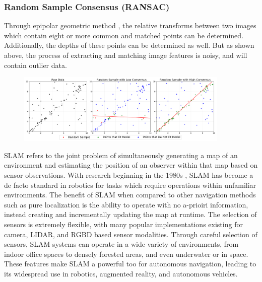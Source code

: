 \subsubsection{Random Sample Consensus (RANSAC)}

Through epipolar geometric method , the relative transforms between two images which contain eight or more common and matched points can be determined\cite{longuet-higginsComputerAlgorithmReconstructing1981}\cite{hartleyDefenseEightpointAlgorithm1997}. Additionally, the depths of these points can be determined as well. But as shown above, the process of extracting and matching image features is noisy, and will contain outlier data. 

\begin{figure}[!ht]
    \centering
    \includegraphics[width=0.9\textwidth]{resources/ransac.png}
    \caption[2D RANSAC Example]{}
    \label{fig:ransac}
\end{figure}

SLAM refers to the joint problem of simultaneously generating a map of an environment and estimating the position of an observer within that map based on sensor observations. With research beginning in the 1980s \cite{smithEstimatingUncertainSpatial1988}, SLAM has become a de facto standard in robotics for tasks which require operations within unfamiliar environments. The benefit of SLAM when compared to other navigation methods such as pure localization is the ability to operate with no a-prioiri information, instead creating and incrementally updating the map at runtime. The selection of sensors is extremely flexible, with many popular implementations existing for camera, LIDAR, and RGBD based sensor modalities. Through careful selection of sensors, SLAM systems can operate in a wide variety of environments, from indoor office spaces to densely forested areas, and even underwater or in space.  These features make SLAM a powerful too for autonomous navigation, leading to its widespread use in robotics, augmented reality, and autonomous vehicles.

